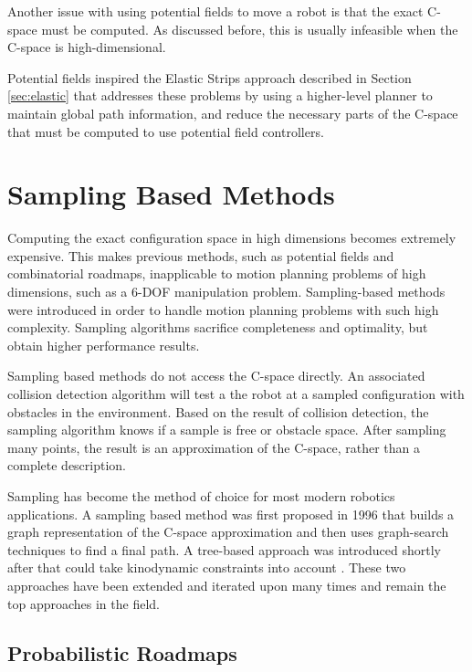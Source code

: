 \documentclass[10pt,conference]{ieeeconf}
\begin{document}
Another issue with using potential fields to move a robot is that the exact C-space must be computed. As discussed before, this is usually infeasible when the C-space is high-dimensional.

Potential fields inspired the Elastic Strips approach described in Section \ref{sec:elastic} that addresses these problems by using a higher-level planner to maintain global path information, and reduce the necessary parts of the C-space that must be computed to use potential field controllers.




	
\section{Sampling Based Methods}

Computing the exact configuration space in high dimensions becomes extremely expensive. This makes previous methods, such as potential fields and combinatorial roadmaps, inapplicable to motion planning problems of high dimensions, such as a 6-DOF manipulation problem. Sampling-based methods were introduced in order to handle motion planning problems with such high complexity. Sampling algorithms sacrifice completeness and optimality, but obtain higher performance results. 

Sampling based methods do not access the C-space directly. An associated collision detection algorithm will test a the robot at a sampled configuration with obstacles in the environment. Based on the result of collision detection, the sampling algorithm knows if a sample is free or obstacle space. After sampling many points, the result is an approximation of the C-space, rather than a complete description. 

Sampling has become the method of choice for most modern robotics applications. A sampling based method was first proposed in 1996 \cite{PRM} that builds a graph representation of the C-space approximation and then uses graph-search techniques to find a final path. A tree-based approach was introduced shortly after that could take kinodynamic constraints into account \cite{RRT}. These two approaches have been extended and iterated upon many times and remain the top approaches in the field.

\subsection{Probabilistic Roadmaps}
\end{document}
